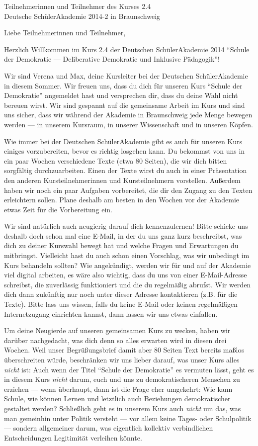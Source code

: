 \documentclass[a4paper]{letter}
\date{15.\ April 2014}
\begin{document}
\begin{letter}{
	Teilnehmerinnen und Teilnehmer des Kurses 2.4 \\
	Deutsche SchülerAkademie 2014-2 in Braunschweig}

\opening{Liebe Teilnehmerinnen und Teilnehmer,}

Herzlich Willkommen im Kurs 2.4 der Deutschen SchülerAkademie 2014 "`Schule der Demokratie --- Deliberative Demokratie und Inklusive Pädagogik"'!

Wir sind Verena und Max, deine Kursleiter bei der Deutschen SchülerAkademie in diesem Sommer.
Wir freuen uns, dass du dich für unseren Kurs "`Schule der Demokratie"' angemeldet hast und versprechen dir, dass du deine Wahl nicht bereuen wirst.
Wir sind gespannt auf die gemeinsame Arbeit im Kurs und sind uns sicher, dass wir während der Akademie in Braunschweig jede Menge bewegen werden --– in unserem Kursraum, in unserer Wissenschaft und in unseren Köpfen.

Wie immer bei der Deutschen SchülerAkademie gibt es auch für unseren Kurs einiges vorzubereiten, bevor es richtig losgehen kann.
Du bekommst von uns in ein paar Wochen verschiedene Texte (etwa 80 Seiten), die wir dich bitten sorgfältig durchzuarbeiten.
Einen der Texte wirst du auch in einer Präsentation den anderen Kursteilnehmerinnen und Kursteilnehmern vorstellen.
Außerdem haben wir noch ein paar Aufgaben vorbereitet, die dir den Zugang zu den Texten erleichtern sollen.
Plane deshalb am besten in den Wochen vor der Akademie etwas Zeit für die Vorbereitung ein.

Wir sind natürlich auch neugierig darauf dich kennenzulernen!
Bitte schicke uns deshalb doch schon mal eine E-Mail, in der du uns ganz kurz beschreibst, was dich zu deiner Kurswahl bewegt hat und welche Fragen und Erwartungen du mitbringst.
Vielleicht hast du auch schon einen Vorschlag, was wir unbedingt im Kurs behandeln sollten?
Wie angekündigt, werden wir für und auf der Akademie viel digital arbeiten, es wäre also wichtig, dass du uns von einer E-Mail-Adresse schreibst, die zuverlässig funktioniert und die du regelmäßig abrufst.
Wir werden dich dann zukünftig nur noch unter dieser Adresse kontaktieren (z.B. für die Texte).
Bitte lass uns wissen, falls du keine E-Mail oder keinen regelmäßigen Internetzugang einrichten kannst, dann lassen wir uns etwas einfallen.

Um deine Neugierde auf unseren gemeinsamen Kurs zu wecken, haben wir darüber nachgedacht, was dich denn so alles erwarten wird in diesen drei Wochen.
Weil unser Begrüßungsbrief damit aber 80 Seiten Text bereits maßlos überschreiten würde, beschränken wir uns lieber darauf, was unser Kurs alles \emph{nicht} ist:
Auch wenn der Titel "`Schule der Demokratie"' es vermuten lässt, geht es in diesem Kurs \emph{nicht} darum, euch und uns zu demokratischeren Menschen zu erziehen --- wenn überhaupt, dann ist die Frage eher umgekehrt: Wie kann Schule, wie können Lernen und letztlich auch Beziehungen demokratischer gestaltet werden?
Schließlich geht es in unserem Kurs auch \emph{nicht} um das, was man gemeinhin unter Politik versteht --- vor allem keine Tages- oder Schulpolitik --- sondern allgemeiner darum, was eigentlich kollektiv verbindlichen Entscheidungen Legitimität verleihen könnte.


\end{letter}
\end{document}
